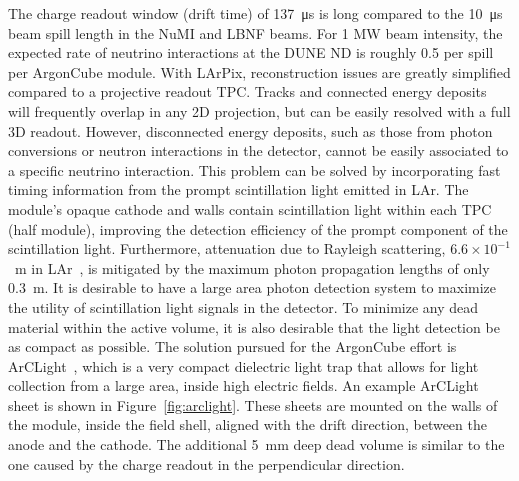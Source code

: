 The charge readout window (drift time) of \SI{137}{\micro\second} is long compared to the \SI{10}{\micro\second}~\cite{numi} beam spill length in the NuMI and LBNF beams.
For 1 MW beam intensity, the expected rate of neutrino interactions at the DUNE ND is roughly 0.5 per spill per ArgonCube module.  
With LArPix, reconstruction issues are greatly simplified compared to a projective readout TPC.
Tracks and connected energy deposits will frequently overlap in any 2D projection, but can be easily resolved with a full 3D readout.
However, disconnected energy deposits, such as those from photon conversions or neutron interactions in the detector, cannot be easily associated to a specific neutrino interaction.
This problem can be solved by incorporating fast timing information from the prompt scintillation light emitted in LAr.
The module's opaque cathode and walls contain scintillation light within each TPC (half module), improving the detection efficiency of the prompt component of the scintillation light. 
Furthermore, attenuation due to Rayleigh scattering, $6.6\times10^{-1}$~m in LAr~\cite{Rayleigh}, is mitigated by the maximum photon propagation lengths of only \SI{0.3}{\metre}. 
It is desirable to have a large area photon detection system to maximize the utility of scintillation light signals in the detector. 
To minimize any dead material within the active volume, it is also desirable that the light detection be as compact as possible. 
The solution pursued for the ArgonCube effort is ArCLight~\cite{arclight}, which is a very compact dielectric light trap that allows for light collection from a large area, inside high electric fields. 
An example ArCLight sheet is shown in Figure~\ref{fig:arclight}. These sheets are mounted on the walls of the module, inside the field shell, aligned with the drift direction, between the anode and the cathode. 
The additional \SI{5}{\milli\metre} deep dead volume is similar to the one caused by the charge readout in the perpendicular direction.

